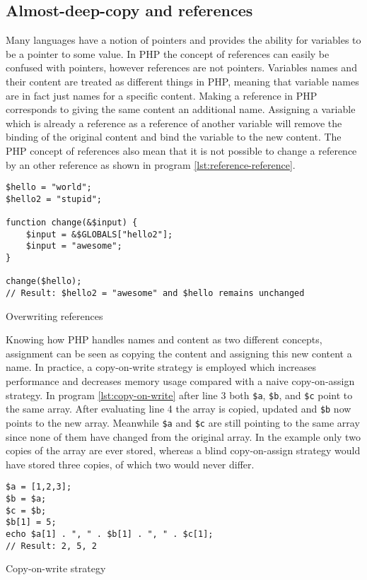 \subsection{Almost-deep-copy and references}
\label{sec:backg_references}
Many languages have a notion of pointers and provides the ability for variables to be a pointer to some value. In PHP the concept of references can easily be confused with pointers, however references are not pointers. Variables names and their content are treated as different things in PHP, meaning that variable names are in fact just names for a specific content. Making a reference in PHP corresponds to giving the same content an additional name. Assigning a variable which is already a reference as a reference of another variable will remove the binding of the original content and bind the variable to the new content. The PHP concept of references also mean that it is not possible to change a reference by an other reference as shown in program \ref{lst:reference-reference}.

\begin{program}
\begin{lstlisting}
$hello = "world";
$hello2 = "stupid";

function change(&$input) {
    $input = &$GLOBALS["hello2"];
    $input = "awesome";
}

change($hello);
// Result: $hello2 = "awesome" and $hello remains unchanged
\end{lstlisting}
\caption{Overwriting references}
\label{lst:reference-reference}
\end{program}

Knowing how PHP handles names and content as two different concepts, assignment can be seen as copying the content and assigning this new content a name. In practice, a copy-on-write strategy is employed which increases performance and decreases memory usage compared with a naive copy-on-assign strategy. In program \ref{lst:copy-on-write} after line 3 both \texttt{\$a}, \texttt{\$b}, and \texttt{\$c} point to the same array. After evaluating line 4 the array is copied, updated and \texttt{\$b} now points to the new array. Meanwhile \texttt{\$a} and \texttt{\$c} are still pointing to the same array since none of them have changed from the original array. In the example only two copies of the array are ever stored, whereas a blind copy-on-assign strategy would have stored three copies, of which two would never differ.

\begin{program}
\begin{lstlisting}
$a = [1,2,3];
$b = $a;
$c = $b;
$b[1] = 5;
echo $a[1] . ", " . $b[1] . ", " . $c[1];
// Result: 2, 5, 2
\end{lstlisting}
\caption{Copy-on-write strategy}
\label{lst:copy-on-write}
\end{program}

